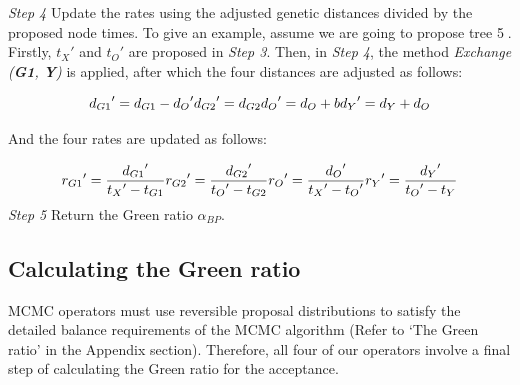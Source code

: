 \documentclass{bmcart}
\begin{document}
\emph{Step 4}  Update the rates using the adjusted genetic distances divided by the proposed node times. To give an example, assume we are going to propose tree \textcircled5. Firstly, ${t_X}'$ and ${t_O}'$ are proposed in \emph{Step 3}.  Then, in \emph{Step 4}, the method \textit{Exchange (\textbf{G1}, \textbf{Y})} is applied, after which the four distances are adjusted as follows:

\begin{equation}\label{example2.1}
{d_{G1}}' = {d_{G1}} - {d_O}'  \\
{d_{G2}}' = {d_{G2}}  \\
{d_O}' = {d_O} + b  \\
{d_Y}' = {d_Y} + {d_O} 
\end{equation}

And the four rates are updated as follows:

\begin{equation}\label{example2.2}
{r_{G1}}' = \frac{{{d_{G1}}'}}{{{t_X}' - {t_{G1}}}} \\
{r_{G2}}' = \frac{{{d_{G2}}'}}{{{t_O}' - {t_{G2}}}} \\
{r_O}' = \frac{{{d_O}'}}{{{t_X}' - {t_O}'}} \\
{r_Y}' = \frac{{{d_Y}'}}{{{t_O}' - {t_Y}}} 
\end{equation}
\emph{Step 5} Return the Green ratio ${\alpha_{BP}}$.

\subsection*{Calculating the Green ratio}
MCMC operators must use reversible proposal distributions to satisfy the detailed balance requirements of the MCMC algorithm (Refer to `The Green ratio' in the Appendix section). Therefore, all four of our operators involve a final step of calculating the Green ratio for the acceptance.
\end{document}
